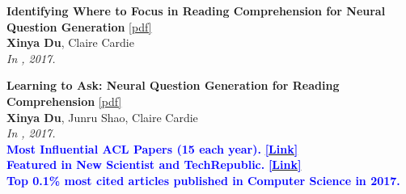 \begin{enumerate}[{[}1{]},resume,leftmargin=*]
\parbox{\linewidth}{
\item
{\bf Identifying Where to Focus in Reading Comprehension for Neural Question Generation}
\href{https://aclanthology.org/D17-1219.pdf}{{[pdf]}} \\
{{\bf Xinya Du}, Claire Cardie} \\
{\it In \EMNLP, 2017.}\\

}

\parbox{\linewidth}{
\item\label{pub:learn2ask}
{\bf Learning to Ask: Neural Question Generation for Reading Comprehension}  
\href{https://aclanthology.org/P17-1123.pdf}{{[pdf]}} \\
{{\bf Xinya Du}, Junru Shao, Claire Cardie}    \\
{\it In \ACL, 2017.}\\
% 
{\textcolor{blue}{\textbf{Most Influential ACL Papers (15 each year).}}} \href{https://www.paperdigest.org/2024/05/most-influential-acl-papers-2024-05/}{\textcolor{blue}{\textbf{[Link]}}} \\ 
\textbf{{\textcolor{blue}{Featured in New Scientist and TechRepublic.}}}
\textbf{\href{https://www.newscientist.com/article/2130205-inquisitive-bot-asks-questions-to-test-your-understanding/}{\textcolor{blue}{[Link]}}} \\ 
{\textcolor{blue}{\textbf{Top 0.1\% most cited articles published in Computer Science in 2017.}}} \\
% 


% 
}

\end{enumerate}

